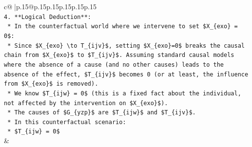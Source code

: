 \documentclass{article}
\begin{document}
{\begin{supertabular}{c@{$\;$}|p{.15\linewidth}@{}p{.15\linewidth}p{.15\linewidth}p{.15\linewidth}p{.15\linewidth}p{.15\linewidth}}
{{{\\ 
\texttt{4.  **Logical Deduction**:} \\
\texttt{    *   In the counterfactual world where we intervene to set \$X\_\{exo\} = 0\$:} \\
\texttt{        *   Since \$X\_\{exo\} \textbackslash{}to T\_\{ijv\}\$, setting \$X\_\{exo\}=0\$ breaks the causal chain from \$X\_\{exo\}\$ to \$T\_\{ijv\}\$. Assuming standard causal models where the absence of a cause (and no other causes) leads to the absence of the effect, \$T\_\{ijv\}\$ becomes 0 (or at least, the influence from \$X\_\{exo\}\$ is removed).} \\
\texttt{        *   We know \$T\_\{ijw\} = 0\$ (this is a fixed fact about the individual, not affected by the intervention on \$X\_\{exo\}\$).} \\
\texttt{        *   The causes of \$G\_\{yzp\}\$ are \$T\_\{ijw\}\$ and \$T\_\{ijv\}\$.} \\
\texttt{        *   In this counterfactual scenario:} \\
\texttt{            *   \$T\_\{ijw\} = 0\$} \\
            }
        }
    }
    & \\ \\


\end{supertabular}}
\end{document}
